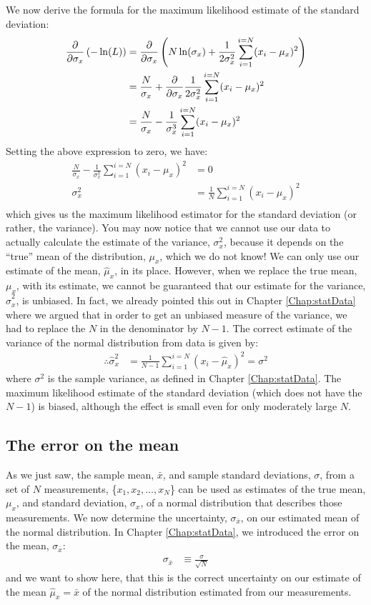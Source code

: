 We now derive the formula for the maximum likelihood estimate of the standard deviation:
\begin{align}
\frac{\partial }{\partial \sigma_x}\left(-\ln(L)\right) &= \frac{\partial }{\partial \sigma_x}\left(N\ln(\sigma_x)+\frac{1}{2\sigma_x^2}\sum_{i=1}^{i=N}(x_i-\mu_x)^2\right)\nonumber\\
&=\frac{N}{\sigma_x}+\frac{\partial }{\partial \sigma_x}\frac{1}{2\sigma_x^2}\sum_{i=1}^{i=N}(x_i-\mu_x)^2\nonumber\\
&=\frac{N}{\sigma_x}-\frac{1}{\sigma_x^3}\sum_{i=1}^{i=N}(x_i-\mu_x)^2\nonumber\\
\end{align}
Setting the above expression to zero, we have:
\begin{align}
\frac{N}{\sigma_x}-\frac{1}{\sigma_x^3}\sum_{i=1}^{i=N}(x_i-\mu_x)^2&=0\nonumber\\
\sigma_x^2&=\frac{1}{N}\sum_{i=1}^{i=N}(x_i-\mu_x)^2\nonumber\\
\end{align}
which gives us the maximum likelihood estimator for the standard deviation (or rather, the variance). You may now notice that we cannot use our data to actually calculate the estimate of the variance, $\sigma_x^2$, because it depends on the ``true'' mean of the distribution, $\mu_x$, which we do not know! We can only use our estimate of the mean, $\hat\mu_x$, in its place. However, when we replace the true mean, $\mu_x$, with its estimate, we cannot be guaranteed that our estimate for the variance, $\hat\sigma_x^2$, is unbiased. In fact, we already pointed this out in Chapter \ref{Chap:statData} where we argued that in order to get an unbiased measure of the variance, we had to replace the $N$ in the denominator by $N-1$. The correct estimate of the variance of the normal distribution from data is given by:
\begin{align}
\therefore \hat\sigma_x^2&=\frac{1}{N-1}\sum_{i=1}^{i=N}(x_i-\hat\mu_x)^2=\sigma^2
\end{align}
where $\sigma^2$ is the sample variance, as defined in Chapter \ref{Chap:statData}. The maximum likelihood estimate of the standard deviation (which does not have the $N-1$) is biased, although the effect is small even for only moderately large $N$.

\subsection{The error on the mean}
As we just saw, the sample mean, $\bar x$, and sample standard deviations, $\sigma$, from a set of $N$ measurements, \{$x_1, x_2, \dots,x_N$\} can be used as estimates of the true mean, $\mu_x$, and standard deviation, $\sigma_x$, of a normal distribution that describes those measurements. We now determine the uncertainty, $\sigma_{\bar x}$, on our estimated mean of the normal distribution. In Chapter \ref{Chap:statData}, we introduced the error on the mean, $\sigma_{\bar x}$:
\begin{align}
\sigma_{\bar x}&\equiv \frac{\sigma}{\sqrt{N}}
\end{align}
and we want to show here, that this is the correct uncertainty on our estimate of the mean $\hat\mu_x=\bar x$ of the normal distribution estimated from our measurements.

